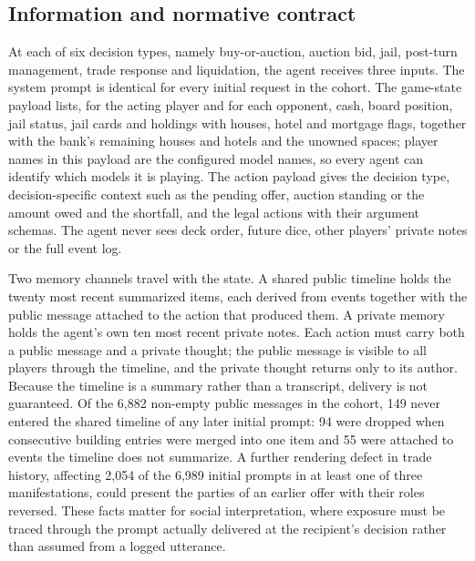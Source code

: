 \subsection{Information and normative contract}
\label{sec:contract}

At each of six decision types, namely buy-or-auction, auction bid, jail, post-turn management, trade response and liquidation, the agent receives three inputs. The system prompt is identical for every initial request in the cohort. The game-state payload lists, for the acting player and for each opponent, cash, board position, jail status, jail cards and holdings with houses, hotel and mortgage flags, together with the bank's remaining houses and hotels and the unowned spaces; player names in this payload are the configured model names, so every agent can identify which models it is playing. The action payload gives the decision type, decision-specific context such as the pending offer, auction standing or the amount owed and the shortfall, and the legal actions with their argument schemas. The agent never sees deck order, future dice, other players' private notes or the full event log.

Two memory channels travel with the state. A shared public timeline holds the twenty most recent summarized items, each derived from events together with the public message attached to the action that produced them. A private memory holds the agent's own ten most recent private notes. Each action must carry both a public message and a private thought; the public message is visible to all players through the timeline, and the private thought returns only to its author. Because the timeline is a summary rather than a transcript, delivery is not guaranteed. Of the 6,882 non-empty public messages in the cohort, 149 never entered the shared timeline of any later initial prompt: 94 were dropped when consecutive building entries were merged into one item and 55 were attached to events the timeline does not summarize. A further rendering defect in trade history, affecting 2,054 of the 6,989 initial prompts in at least one of three manifestations, could present the parties of an earlier offer with their roles reversed. These facts matter for social interpretation, where exposure must be traced through the prompt actually delivered at the recipient's decision rather than assumed from a logged utterance.

